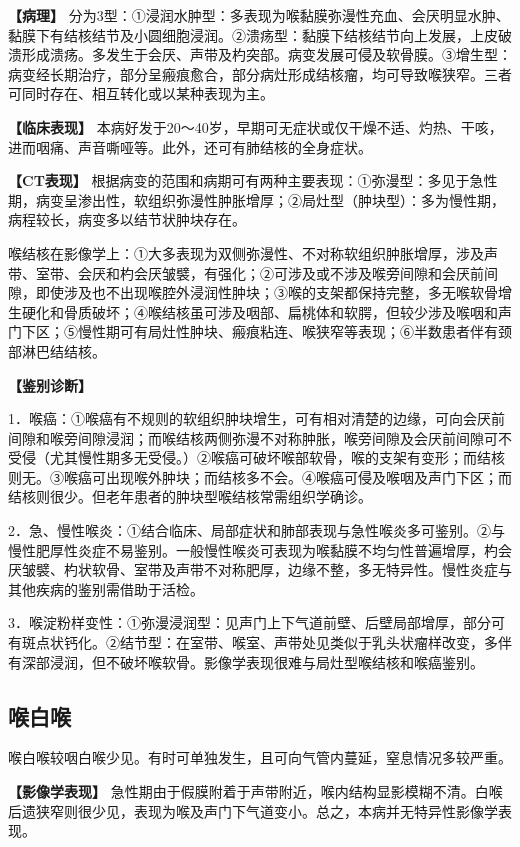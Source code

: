 \textbf{【病理】}
分为3型：①浸润水肿型：多表现为喉黏膜弥漫性充血、会厌明显水肿、黏膜下有结核结节及小圆细胞浸润。②溃疡型：黏膜下结核结节向上发展，上皮破溃形成溃疡。多发生于会厌、声带及杓突部。病变发展可侵及软骨膜。③增生型：病变经长期治疗，部分呈瘢痕愈合，部分病灶形成结核瘤，均可导致喉狭窄。三者可同时存在、相互转化或以某种表现为主。

\textbf{【临床表现】}
本病好发于20～40岁，早期可无症状或仅干燥不适、灼热、干咳，进而咽痛、声音嘶哑等。此外，还可有肺结核的全身症状。

\textbf{【CT表现】}
根据病变的范围和病期可有两种主要表现：①弥漫型：多见于急性期，病变呈渗出性，软组织弥漫性肿胀增厚；②局灶型（肿块型）：多为慢性期，病程较长，病变多以结节状肿块存在。

喉结核在影像学上：①大多表现为双侧弥漫性、不对称软组织肿胀增厚，涉及声带、室带、会厌和杓会厌皱襞，有强化；②可涉及或不涉及喉旁间隙和会厌前间隙，即使涉及也不出现喉腔外浸润性肿块；③喉的支架都保持完整，多无喉软骨增生硬化和骨质破坏；④喉结核虽可涉及咽部、扁桃体和软腭，但较少涉及喉咽和声门下区；⑤慢性期可有局灶性肿块、瘢痕粘连、喉狭窄等表现；⑥半数患者伴有颈部淋巴结结核。

\textbf{【鉴别诊断】}

1．喉癌：①喉癌有不规则的软组织肿块增生，可有相对清楚的边缘，可向会厌前间隙和喉旁间隙浸润；而喉结核两侧弥漫不对称肿胀，喉旁间隙及会厌前间隙可不受侵（尤其慢性期多无受侵。）②喉癌可破坏喉部软骨，喉的支架有变形；而结核则无。③喉癌可出现喉外肿块；而结核多不会。④喉癌可侵及喉咽及声门下区；而结核则很少。但老年患者的肿块型喉结核常需组织学确诊。

2．急、慢性喉炎：①结合临床、局部症状和肺部表现与急性喉炎多可鉴别。②与慢性肥厚性炎症不易鉴别。一般慢性喉炎可表现为喉黏膜不均匀性普遍增厚，杓会厌皱襞、杓状软骨、室带及声带不对称肥厚，边缘不整，多无特异性。慢性炎症与其他疾病的鉴别需借助于活检。

3．喉淀粉样变性：①弥漫浸润型：见声门上下气道前壁、后壁局部增厚，部分可有斑点状钙化。②结节型：在室带、喉室、声带处见类似于乳头状瘤样改变，多伴有深部浸润，但不破坏喉软骨。影像学表现很难与局灶型喉结核和喉癌鉴别。

\subsection{喉白喉}

喉白喉较咽白喉少见。有时可单独发生，且可向气管内蔓延，窒息情况多较严重。

\textbf{【影像学表现】}
急性期由于假膜附着于声带附近，喉内结构显影模糊不清。白喉后遗狭窄则很少见，表现为喉及声门下气道变小。总之，本病并无特异性影像学表现。

